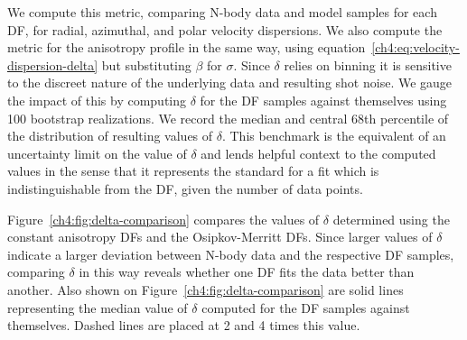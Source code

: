 We compute this metric, comparing N-body data and model samples for each DF, for radial, azimuthal, and polar velocity dispersions. We also compute the metric for the anisotropy profile in the same way, using equation~\eqref{ch4:eq:velocity-dispersion-delta} but substituting $\beta$ for $\sigma$. Since $\delta$ relies on binning it is sensitive to the discreet nature of the underlying data and resulting shot noise. We gauge the impact of this by computing $\delta$ for the DF samples against themselves using 100 bootstrap realizations. We record the median and central 68th percentile of the distribution of resulting values of $\delta$. This benchmark is the equivalent of an uncertainty limit on the value of $\delta$ and lends helpful context to the computed values in the sense that it represents the standard for a fit which is indistinguishable from the DF, given the number of data points.

Figure~\ref{ch4:fig:delta-comparison} compares the values of $\delta$ determined using the constant anisotropy DFs and the Osipkov-Merritt DFs. Since larger values of $\delta$ indicate a larger deviation between N-body data and the respective DF samples, comparing $\delta$ in this way reveals whether one DF fits the data better than another. Also shown on Figure~\ref{ch4:fig:delta-comparison} are solid lines representing the median value of $\delta$ computed for the DF samples against themselves. Dashed lines are placed at 2 and 4 times this value. 

